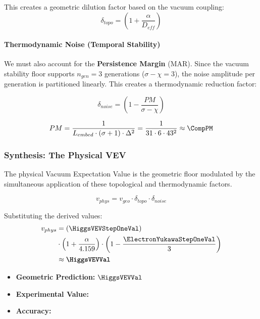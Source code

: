 This creates a geometric dilution factor based on the vacuum coupling:
\begin{equation}
\delta_{topo} = \left( 1 + \frac{\alpha}{D_{eff}} \right)
\end{equation}

\paragraph{Thermodynamic Noise (Temporal Stability)}
We must also account for the \textbf{Persistence Margin} (MAR). Since the vacuum stability floor supports $n_{gen}=3$ generations ($\sigma - \chi = 3$), the noise amplitude per generation is partitioned linearly. This creates a thermodynamic reduction factor:

\begin{equation}
\delta_{noise} = \left( 1 - \frac{PM}{\sigma - \chi} \right)
\end{equation}

\begin{equation}
PM = \frac{1}{L_{embed} \cdot (\sigma + 1) \cdot \Delta^2} = \frac{1}{31 \cdot 6 \cdot 43^2} \approx \CompPM
\end{equation}

\subsubsection{Synthesis: The Physical VEV}
The physical Vacuum Expectation Value is the geometric floor modulated by the simultaneous application of these topological and thermodynamic factors.

\begin{equation}
v_{phys} = v_{geo} \cdot \delta_{topo} \cdot \delta_{noise}
\end{equation}

Substituting the derived values:
\begin{equation}
\begin{split}
v_{phys} &= (\HiggsVEVStepOneVal) \\
& \cdot \left( 1 + \frac{\alpha}{4.159} \right) \cdot \left( 1 - \frac{\ElectronYukawaStepOneVal}{3} \right) \\
& \approx \textbf{$\HiggsVEVVal$}
\end{split}
\end{equation}

\begin{itemize}
    \item \textbf{Geometric Prediction:} $\HiggsVEVVal$
    \item \textbf{Experimental Value:} \HiggsVEVExperimentalValue
    \item \textbf{Accuracy:} \HiggsVEVAccText
\end{itemize}

